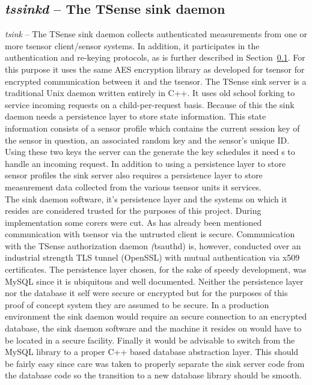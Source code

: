 \subsection{\textit{tssinkd} -- The TSense sink daemon}

\textit{tsink} -- The TSense sink daemon collects authenticated measurements from one or more tsensor client/sensor systems. In addition, it participates in the authentication and re-keying protocols, as is further described in Section~\ref{}.  For this purpose it uses the same AES encryption library as developed for tsensor for  encrypted communication between it and the tsensor.  The TSense sink server is a traditional Unix daemon written entirely in C++. It uses old school forking to service incoming requests on a child-per-request basis. Because of this the sink daemon needs a persistence layer to store state information. This state information consists of a sensor profile which contains the current session key of the sensor in question, an associated random key and the sensor's unique ID. Using these two keys the server can the generate the key schedules it need s to handle an incoming request. In addition to using a persistence layer to store sensor profiles the sink server  also requires a persistence layer to store measurement data collected from the various tsensor units it services.\\


The sink daemon software, it's persistence layer and the systems on which it resides are considered trusted for the purposes of this project. During implementation some corers were cut. As has already been mentioned communication with tsensor via the untrusted client is secure. Communication with the TSense authorization daemon \emph(tsauthd) is, however, conducted over an industrial strength TLS tunnel (OpenSSL) with mutual authentication via x509 certificates. The persistence layer chosen, for the sake of speedy development, was MySQL since it is ubiquitous and well documented. Neither the persistence layer nor the database it self were secure or encrypted but for the purposes of this proof of concept system they are assumed to be secure. In a production environment the sink daemon would require an secure connection to an encrypted database, the sink daemon software and the machine it resides on would have to be located in a secure facility. Finally it would be advisable to switch from the MySQL library to a proper C++ based database abstraction layer. This should be fairly easy since care was taken to properly separate the sink server code from the database code so the transition to a new database library should be smooth.

